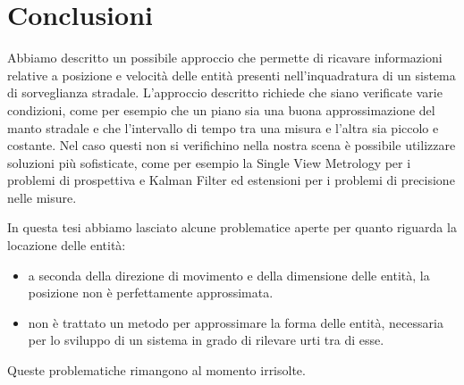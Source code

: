 \chapter{Conclusioni}
\label{sec:conclusioni}

Abbiamo descritto un possibile approccio che permette di ricavare informazioni relative a posizione e velocità delle entità presenti nell'inquadratura di un sistema di sorveglianza stradale.
L'approccio descritto richiede che siano verificate varie condizioni, come per esempio che un piano sia una buona approssimazione del manto stradale e che l'intervallo di tempo tra una misura e l'altra sia piccolo e costante.
Nel caso questi non si verifichino nella nostra scena è possibile utilizzare soluzioni più sofisticate, come per esempio la Single View Metrology \cite{svm} per i problemi di prospettiva e Kalman Filter ed estensioni \cite{kalman} per i problemi di precisione nelle misure.

In questa tesi abbiamo lasciato alcune problematice aperte per quanto riguarda la locazione delle entità:
\begin{itemize}
    \item a seconda della direzione di movimento e della dimensione delle entità, la posizione non è perfettamente approssimata.
    \item non è trattato un metodo per approssimare la forma delle entità, necessaria per lo sviluppo di un sistema in grado di rilevare urti tra di esse.
\end{itemize}
Queste problematiche rimangono al momento irrisolte.
